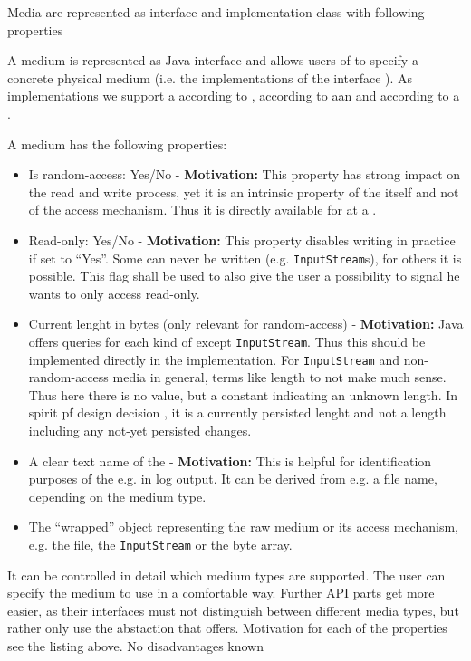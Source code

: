 {%
Media are represented as interface and implementation class with following properties
}
{%
A medium is represented as Java interface \IMedium{} and allows users of \LibName{} to specify a concrete physical medium (i.e. the implementations of the interface \IMedium{}). As implementations we support a \FileMedium{} according to , according to  aan \InputStreamMedium{} and according to  a \InMemoryMedium{}.

A medium has the following properties:
\begin{itemize}
	\item Is random-access: Yes/No \-- \textbf{Motivation:} This property has strong impact on the read and write process, yet it is an intrinsic property of the \TERMmedium{} itself and not of the access mechanism. Thus it is directly available for at a \TERMmedium{}.
	\item Read-only: Yes/No \-- \textbf{Motivation:} This property disables writing in practice if set to ``Yes''. Some \TERMmedia{} can never be written (e.g. \texttt{InputStream}s), for others it is possible. This flag shall be used to also give the \LibName{} user a possibility to signal he wants to only access read-only.
	\item Current lenght in bytes (only relevant for random-access) \-- \textbf{Motivation:} Java offers queries for each kind of \IMedium{} except \texttt{InputStream}. Thus this should be implemented directly in the \IMedium{} implementation. For \texttt{InputStream} and non-random-access media in general, terms like length to not make much sense. Thus here there is no value, but a constant indicating an unknown length. In spirit pf design decision , it is a currently persisted lenght and not a length including any not-yet persisted changes.
	\item A clear text name of the \TERMmedium{} \-- \textbf{Motivation:} This is helpful for identification purposes of the \IMedium{} e.g. in log output. It can be derived from e.g. a file name, depending on the medium type.
	\item The ``wrapped'' object representing the raw medium or its access mechanism, e.g. the file, the \texttt{InputStream} or the byte array.
\end{itemize}
}
{%
It can be controlled in detail which medium types are supported. The user can specify the medium to use in a comfortable way. Further API parts get more easier, as their interfaces must not distinguish between different media types, but rather only use the abstaction that \IMedium{} offers. Motivation for each of the properties see the listing above.
}
{%
No disadvantages known
}

